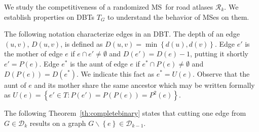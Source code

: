 \documentclass[preprint]{elsarticle}
\newcommand{\set}[1]{\left\{ #1 \right\}}
\newcommand{\mcalr}{\mathcal{R}}
\newcommand{\mcald}{\mathcal{D}}
\newcommand{\mts}{MS}
\newcommand{\ebt}{DBT}
\begin{document}
We study the competitiveness of a randomized \mts ~for road atlases $\mcalr_k$. We establish properties on \ebt s $T_G$ to understand the behavior of \mts es on them. 

The following notation characterize edges in an \ebt . The depth of an edge $(u,v)$, $D(u,v)$, is defined as $D(u,v) = \min \set{d(u),d(v)}$. Edge $e'$ is the mother of edge $e$ if $e \cap e' \neq \emptyset$ and $D(e') = D(e) - 1$, putting it shortly $e' = P(e)$. Edge $e^*$ is the aunt of edge $e$ if $e^* \cap P(e) \neq \emptyset$ and $D\left(P(e)\right) = D(e^*)$. We indicate this fact as $e^* = U(e)$. Observe that the aunt of $e$ and its mother share the same ancestor which may be written formally as $U(e) = \set{e' \in T: P(e') = P(P(e)) = P^2(e)}$.

The following Theorem~\ref{th:completebinary} states that cutting one edge from $G \in \mcald_k$ results on a graph $G \backslash \set{e} \in \mcald_{k-1}$.
\end{document}
